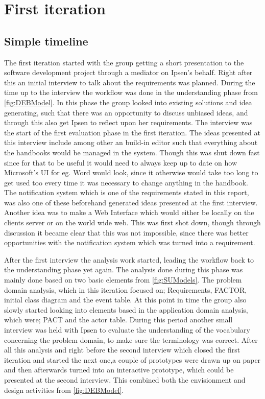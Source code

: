 \section{First iteration}\label{sec:Iteration1}
\subsection{Simple timeline}
The first iteration started with the group getting a short presentation to the software development project through a mediator on Ipsen's behalf.
Right after this an initial interview to talk about the requirements was planned.
During the time up to the interview the workflow was done in the understanding phase from \cref{fig:DEBModel}.
In this phase the group looked into existing solutions and idea generating, such that there was an opportunity to discuss unbiased ideas, and through this also get Ipsen to reflect upon her requirements.
The interview was the start of the first evaluation phase in the first iteration.
The ideas presented at this interview include among other an build-in editor such that everything about the handbooks would be managed in the system.
Though this was shut down fast since for that to be useful it would need to always keep up to date on how Microsoft's UI for eg. Word would look, since it otherwise would take too long to get used too every time it was necessary to change anything in the handbook.
The notification system which is one of the requirements stated in this report, was also one of these beforehand generated ideas presented at the first interview. 
Another idea was to make a Web Interface which would either be locally on the clients server or on the world wide web. This was first shot down, though through discussion it became clear that this was not impossible, since there was better opportunities with the notification system which was turned into a requirement.

After the first interview the analysis work started, leading the workflow back to the understanding phase yet again.
The analysis done during this phase was mainly done based on two basic elements from \cref{fig:SUModels}.
The problem domain analysis, which in this iteration focused on; Requirements, FACTOR, initial class diagram and the event table.
At this point in time the group also slowly started looking into elements based in the application domain analysis, which were; PACT and the actor table.
During this period another small interview was held with Ipsen to evaluate the understanding of the vocabulary concerning the problem domain, to make sure the terminology was correct.
After all this analysis and right before the second interview which closed the first iteration and started the next one,a couple of prototypes were drawn up on paper and then afterwards turned into an interactive prototype, which could be presented at the second interview.
This combined both the envisionment and design activities from \cref{fig:DEBModel}.

